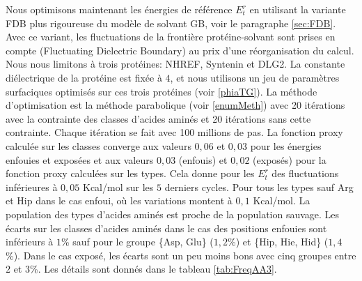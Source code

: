 Nous optimisons maintenant les énergies de référence $E_t^r$ en utilisant la variante FDB plus rigoureuse du modèle de solvant GB, voir le paragraphe \ref{sec:FDB}. Avec ce variant, les fluctuations de la frontière protéine-solvant sont prises en compte (\of Fluctuating Dielectric Boundary\fg) au prix d'une réorganisation du calcul. Nous nous limitons à trois protéines: NHREF, Syntenin et DLG2. La constante diélectrique de la protéine est fixée à $4$, et nous utilisons un jeu de paramètres surfaciques optimisés sur ces trois protéines (voir \ref{phiaTG}). La méthode d'optimisation est la méthode parabolique (voir \ref{enumMeth}) avec 20 itérations avec la contrainte des classes d'acides aminés et 20 itérations sans cette contrainte. Chaque itération se fait avec 100 millions de pas. La fonction proxy calculée sur les classes converge aux valeurs $0,06$ et $0,03$ pour les énergies enfouies et exposées et aux valeurs $0,03$ (enfouis) et $0,02$ (exposés) pour la fonction proxy calculées sur les types. Cela donne pour les $E_t^r$ des fluctuations inférieures à $0,05$ Kcal/mol sur les $5$ derniers cycles. Pour tous les types sauf Arg et Hip dans le cas enfoui, où les variations montent à $0,1$ Kcal/mol. La population des types d'acides aminés est proche de la population sauvage. Les écarts sur les classes d'acides aminés dans le cas des positions enfouies sont inférieurs à $1$\%  sauf pour le groupe \{Asp, Glu\} ($1,2$\%)  et \{Hip, Hie, Hid\} ($1,4$\%). Dans le cas exposé, les écarts sont un peu moins bons avec cinq groupes entre $2$ et $3$\%. Les détails sont donnés dans le tableau \ref{tab:FreqAA3}.

